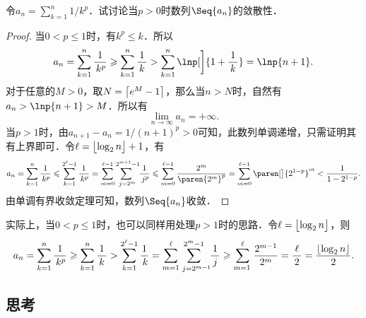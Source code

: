 \begin{example*}
  令\(a_n = \sum\limits_{k=1}^n 1/k^p\)．试讨论当\(p > 0\)时数列\(\Seq{a_n}\)的敛散性．

  \begin{proof}
    当\(0 < p \le 1\)时，有\(k^p \le k\)．所以
    \begin{equation*}
      a_n = \sum_{k=1}^n \frac1{\,k^p} \ge \sum_{k=1}^n \frac1{\,k\,}
      > \sum_{k=1}^n \lnp[\bigg]{1+\frac1{\,k\,}} = \lnp{n+1}.
    \end{equation*}
    对于任意的\(M > 0\)，取\(N = \ceil[\big]{e^M - 1}\)，那么当\(n > N\)时，自然有\(a_n > \lnp{n+1} > M\)．所以有
    \begin{equation*}
      \lim_{n\to\infty} a_n = +\infty.
    \end{equation*}
    当\(p > 1\)时，由\(a_{n+1} - a_n = 1/(n+1)^p > 0\)可知，此数列单调递增，只需证明其有上界即可．令\(\ell = \floor[\big]{\log_2 n} + 1\)，有
    \begin{equation*}
      a_n
      = \sum_{k=1}^n \frac1{\,k^p}
      \le \sum_{k=1}^{2^\ell-1} \frac1{\,k^p}
      = \sum_{m=0}^{\ell-1} \! \sum_{\,j=2^m\!}^{\,2^{m+1}-1\!\!} \frac{1}{\,j^p}
      \le \sum_{m=0}^{\ell-1} \frac{2^m}{\paren{2^m}^p}
      = \sum_{m=0}^{\ell-1} \paren[\big]{2^{1-p}}^m
      < \frac{1}{1-2^{1-p}}.
    \end{equation*}
    由单调有界收敛定理可知，数列\(\Seq{a_n}\)收敛．
  \end{proof}

  \begin{remark}
    实际上，当\(0 < p \le 1\)时，也可以同样用处理\(p > 1\)时的思路．令\(\ell = \floor[\big]{\log_2 n}\)，则
    \begin{equation*}
      a_n
      = \sum_{k=1}^n \frac1{\,k^p}
      \ge \sum_{k=1}^n \frac1{\,k\,}
      > \sum_{k=1}^{2^\ell-1} \frac1{\,k}
      = \sum_{m=1}^{\ell} \! \sum_{\,\,j=2^{m-1}\!\!}^{2^m-1} \frac{1}{\,j\,}
      \ge \sum_{m=1\,}^{\ell} \frac{2^{m-1}}{2^m}
      = \frac{\ell}{\,2\,}
      = \frac{\floor{\log_2 n}}{2}.
    \end{equation*}
  \end{remark}
\end{example*}

\subsection*{思考}

